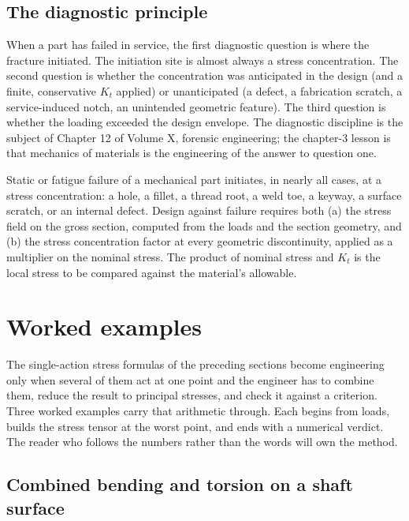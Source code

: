\subsection{The diagnostic principle}

When a part has failed in service, the first diagnostic question is
where the fracture initiated. The initiation site is almost always
a stress concentration. The second question is whether the
concentration was anticipated in the design (and a finite, conservative
$K_t$ applied) or unanticipated (a defect, a fabrication scratch,
a service-induced notch, an unintended geometric feature). The
third question is whether the loading exceeded the design envelope.
The diagnostic discipline is the subject of Chapter 12 of Volume X,
forensic engineering; the chapter-3 lesson is that mechanics of
materials is the engineering of the answer to question one.

\begin{principle}
Static or fatigue failure of a mechanical part initiates, in nearly
all cases, at a stress concentration: a hole, a fillet, a thread
root, a weld toe, a keyway, a surface scratch, or an internal defect.
Design against failure requires both (a) the stress field on the
gross section, computed from the loads and the section geometry, and
(b) the stress concentration factor at every geometric discontinuity,
applied as a multiplier on the nominal stress. The product of
nominal stress and $K_t$ is the local stress to be compared against
the material's allowable.
\end{principle}

\section{Worked examples}

The single-action stress formulas of the preceding sections become
engineering only when several of them act at one point and the engineer
has to combine them, reduce the result to principal stresses, and check
it against a criterion. Three worked examples carry that arithmetic
through. Each begins from loads, builds the stress tensor at the worst
point, and ends with a numerical verdict. The reader who follows the
numbers rather than the words will own the method.

\subsection{Combined bending and torsion on a shaft surface}

